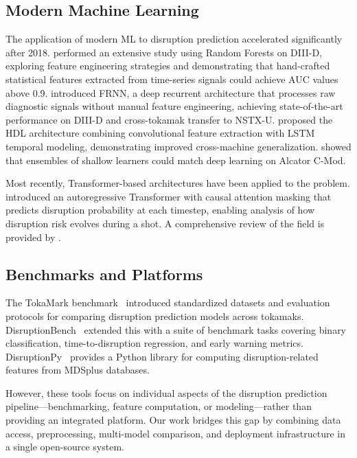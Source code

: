 \documentclass[twocolumn]{article}
\begin{document}
\subsection{Modern Machine Learning}

The application of modern ML to disruption prediction
accelerated significantly after 2018.
\citet{rea2018} performed an extensive study using
Random Forests on DIII-D, exploring feature engineering
strategies and demonstrating that hand-crafted statistical
features extracted from time-series signals could achieve
AUC values above 0.9.
\citet{kates-harbeck2019} introduced FRNN, a deep recurrent
architecture that processes raw diagnostic signals without
manual feature engineering, achieving state-of-the-art
performance on DIII-D and cross-tokamak transfer to NSTX-U.
\citet{zhu2020} proposed the HDL architecture combining
convolutional feature extraction with LSTM temporal modeling,
demonstrating improved cross-machine generalization.
\citet{montes2019} showed that ensembles of shallow learners
could match deep learning on Alcator C-Mod.

Most recently, Transformer-based architectures have been
applied to the problem.
\citet{spangher2024} introduced an autoregressive Transformer
with causal attention masking that predicts disruption
probability at each timestep, enabling analysis of how
disruption risk evolves during a shot.
A comprehensive review of the field is provided
by \citet{zhong2024}.

\subsection{Benchmarks and Platforms}

The TokaMark benchmark~\citep{tokamark2026} introduced
standardized datasets and evaluation protocols for comparing
disruption prediction models across tokamaks.
DisruptionBench~\citep{disruptionbench2025} extended this
with a suite of benchmark tasks covering binary classification,
time-to-disruption regression, and early warning metrics.
DisruptionPy~\citep{disruptionpy2024} provides a Python
library for computing disruption-related features from
MDSplus databases.

However, these tools focus on individual aspects of the
disruption prediction pipeline---benchmarking, feature
computation, or modeling---rather than providing an
integrated platform.
Our work bridges this gap by combining data access,
preprocessing, multi-model comparison, and deployment
infrastructure in a single open-source system.
\end{document}
